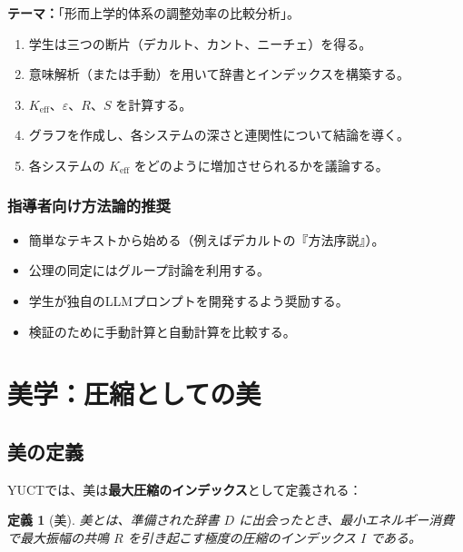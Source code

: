\documentclass[11pt,a4paper]{article}
\newtheorem{definition}{定義}[section]
\newcommand{\eps}{\varepsilon}
\begin{document}
	\textbf{テーマ：}「形而上学的体系の調整効率の比較分析」。
	
	\begin{enumerate}
		\item 学生は三つの断片（デカルト、カント、ニーチェ）を得る。
		\item 意味解析（または手動）を用いて辞書とインデックスを構築する。
		\item \(K_{\mathrm{eff}}\)、\(\eps\)、\(R\)、\(S\) を計算する。
		\item グラフを作成し、各システムの深さと連関性について結論を導く。
		\item 各システムの \(K_{\mathrm{eff}}\) をどのように増加させられるかを議論する。
	\end{enumerate}
	
	\subsubsection{指導者向け方法論的推奨}
	
	\begin{itemize}
		\item 簡単なテキストから始める（例えばデカルトの『方法序説』）。
		\item 公理の同定にはグループ討論を利用する。
		\item 学生が独自のLLMプロンプトを開発するよう奨励する。
		\item 検証のために手動計算と自動計算を比較する。
	\end{itemize}
	
	\section{美学：圧縮としての美}
	
	\subsection{美の定義}
	
	YUCTでは、美は\textbf{最大圧縮のインデックス}として定義される：
	
	\begin{definition}[美]
		美とは、準備された辞書 \(D\) に出会ったとき、最小エネルギー消費で最大振幅の共鳴 \(R\) を引き起こす極度の圧縮のインデックス \(I\) である。
	\end{definition}
	
\end{document}
